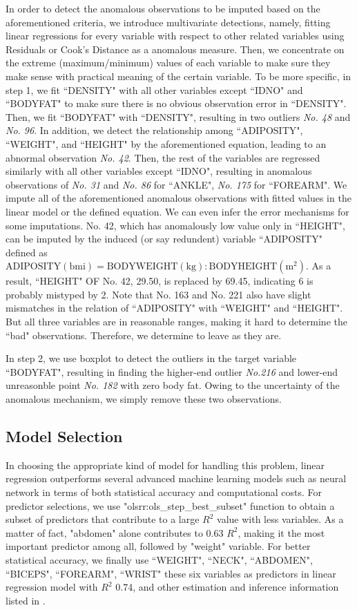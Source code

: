 \documentclass[12pt, letterpaper]{article}
\begin{document}
In order to detect the anomalous observations to be imputed based on the aforementioned criteria, we introduce multivariate detections, namely, fitting linear regressions for every variable with respect to other related variables using Residuals or Cook's Distance as a anomalous measure. Then, we concentrate on the extreme (maximum/minimum) values of each variable to make sure they make sense with practical meaning of the certain variable. To be more specific, in step 1, we fit ``DENSITY" with all other variables except ``IDNO" and ``BODYFAT" to make sure there is no obvious observation error in ``DENSITY". Then, we fit ``BODYFAT" with ``DENSITY", resulting in two outliers \emph{No. 48} and \emph{No. 96}. In addition, we detect the relationship among ``ADIPOSITY", ``WEIGHT", and ``HEIGHT" by the aforementioned equation, leading to an abnormal observation \emph{No. 42}. Then, the rest of the variables are regressed similarly with all other variables except ``IDNO", resulting in anomalous observations of \emph{No. 31} and \emph{No. 86} for ``ANKLE", \emph{No. 175} for ``FOREARM". We impute all of the aforementioned anomalous observations with fitted values in the linear model or the defined equation. We can even infer the error mechanisms for some imputations. No. 42, which has anomalously low value only in ``HEIGHT", can be imputed by the induced (or say redundent) variable ``ADIPOSITY" defined as 
$\mathrm{ADIPOSITY(bmi)} = \mathrm{BODY WEIGHT(kg)} : \mathrm{BODY HEIGHT(m^2)}.$
As a result, ``HEIGHT" OF No. 42, 29.50, is replaced by 69.45, indicating 6 is probably mistyped by 2. Note that No. 163 and No. 221 also have slight mismatches in the relation of ``ADIPOSITY" with ``WEIGHT" and ``HEIGHT". But all three variables are in reasonable ranges, making it hard to determine the ``bad" observations. Therefore, we determine to leave as they are. 

In step 2, we use boxplot to detect the outliers in the target variable ``BODYFAT", resulting in finding the higher-end outlier \emph{No.216} and lower-end unreasonble point \emph{No. 182} with zero body fat. Owing to the uncertainty of the anomalous mechanism, we simply remove these two observations. 

\subsection{Model Selection}
\label{subsec:model}
In choosing the appropriate kind of model for handling this problem, linear regression outperforms several advanced machine learning models such as neural network in terms of both statistical accuracy and computational costs. For predictor selections, we use "olsrr:ols\_step\_best\_subset" function to obtain a subset of predictors that contribute to a large $R^2$ value with less variables. As a matter of fact, "abdomen" alone contributes to 0.63 $R^2$, making it the most important predictor among all, followed by "weight" variable. For better statistical accuracy, we finally use ``WEIGHT", ``NECK", ``ABDOMEN", ``BICEPS", ``FOREARM", ``WRIST" these six variables as predictors in linear regression model with $R^2$ 0.74, and other estimation and inference information listed in . 
\end{document}
